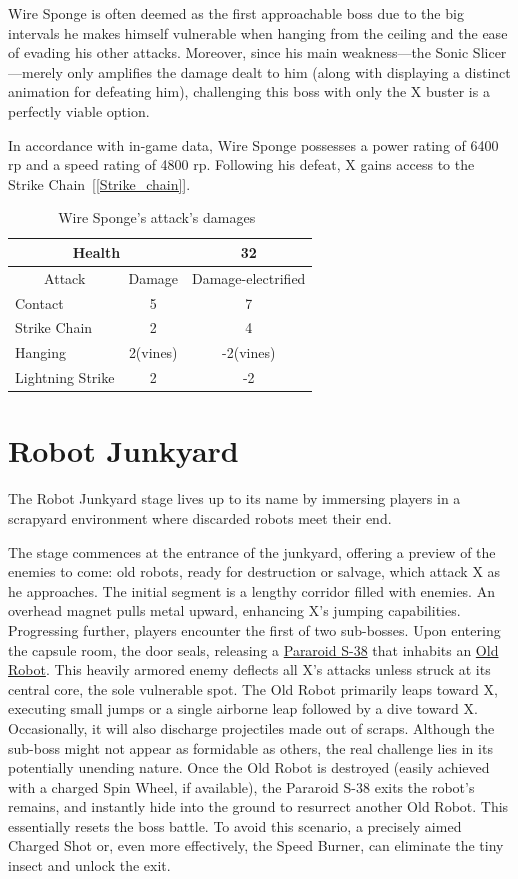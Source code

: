 Wire Sponge is often deemed as the first approachable boss due to the big intervals he makes himself vulnerable when hanging from the ceiling and the ease of evading his other attacks. Moreover, since his main weakness—the Sonic Slicer—merely only amplifies the damage dealt to him (along with displaying a distinct animation for defeating him), challenging this boss with only the X buster is a perfectly viable option.

In accordance with in-game data, Wire Sponge possesses a power rating of 6400 rp and a speed rating of 4800 rp. Following his defeat, X gains access to the Strike Chain~[\ref{Strike_chain}].

\begin{table}[htp]
	\centering
	\begin{tabular}[h]{l c c}
		
		\toprule
		\multicolumn{2}{c}{Health}  & 32\\
		\midrule
		\multicolumn{1}{c}{Attack} & \multicolumn{1}{c}{Damage}& \multicolumn{1}{c}{Damage-electrified}\\
		Contact & 5 & 7\\
		Strike Chain & 2 & 4\\
		Hanging& 2(vines)&-2(vines)\\
		Lightning Strike & 2&-2\\
		\bottomrule
	\end{tabular}
	\caption{Wire Sponge's attack's damages~\cite{wiki:wire_sponge,book:Compendium}}
\end{table}

\section{Robot Junkyard}
The Robot Junkyard stage lives up to its name by immersing players in a scrapyard environment where discarded robots meet their end.

The stage commences at the entrance of the junkyard, offering a preview of the enemies to come: old robots, ready for destruction or salvage, which attack X as he approaches. The initial segment is a lengthy corridor filled with enemies. An overhead magnet pulls metal upward, enhancing X's jumping capabilities. Progressing further, players encounter the first of two sub-bosses. Upon entering the capsule room, the door seals, releasing a \hyperlink{miniboss:Pararoid_S-38}{Pararoid S-38} that inhabits an \hyperlink{miniboss:Old_robot}{Old Robot}. This heavily armored enemy deflects all X's attacks unless struck at its central core, the sole vulnerable spot. The Old Robot primarily leaps toward X, executing small jumps or a single airborne leap followed by a dive toward X. Occasionally, it will also discharge projectiles made out of scraps. Although the sub-boss might not appear as formidable as others, the real challenge lies in its potentially unending nature. Once the Old Robot is destroyed (easily achieved with a charged Spin Wheel, if available), the Pararoid S-38 exits the robot's remains, and instantly hide into the ground to resurrect another Old Robot. This essentially resets the boss battle. To avoid this scenario, a precisely aimed Charged Shot or, even more effectively, the Speed Burner, can eliminate the tiny insect and unlock the exit.

